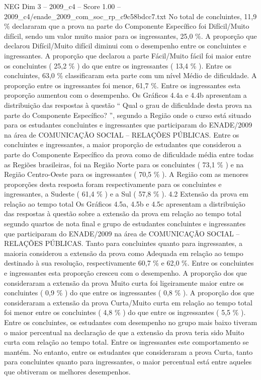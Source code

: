 \begin{textsample}{NEG Dim 3 – 2009\_c4 – Score 1.00 – 2009\_c4/enade\_2009\_com\_soc\_rp\_c9c58bdcc7.txt}
No total de concluintes, 11,9 \% declararam que a prova na parte do Componente Específico foi Difícil/Muito difícil, sendo um valor muito maior para os ingressantes, 25,0 \%.
A proporção que declarou Difícil/Muito difícil diminui com o desempenho entre os concluintes e ingressantes.
A proporção que declarou a parte Fácil/Muito fácil foi maior entre os concluintes ( 25,2 \% ) do que entre os ingressantes ( 13,4 \% ).
Entre os concluintes, 63,0 \% classificaram esta parte com um nível Médio de dificuldade.
A proporção entre os ingressantes foi menor, 61,7 \%.
Entre os ingressantes esta proporção aumentou com o desempenho.
Os Gráficos 4.4a e 4.4b apresentam a distribuição das respostas à questão “ Qual o grau de dificuldade desta prova na parte do Componente Específico? ”, segundo a Região onde o curso está situado para os estudantes concluintes e ingressantes que participaram do ENADE/2009 na área de COMUNICAÇÃO SOCIAL – RELAÇÕES PÚBLICAS.
Entre os concluintes e ingressantes, a maior proporção de estudantes que considerou a parte do Componente Específico da prova como de dificuldade média entre todas as Regiões brasileiras, foi na Região Norte para os concluintes ( 73,1 \% ) e na Região Centro-Oeste para os ingressantes ( 70,5 \% ).
A Região com as menores proporções desta resposta foram respectivamente para os concluintes e ingressantes, a Sudeste ( 61,4 \% ) e a Sul ( 57,8 \% ). 4.2 Extensão da prova em relação ao tempo total Os Gráficos 4.5a, 4.5b e 4.5c apresentam a distribuição das respostas à questão sobre a extensão da prova em relação ao tempo total segundo quartos de nota final e grupo de estudantes concluintes e ingressantes que participaram do ENADE/2009 na área de COMUNICAÇÃO SOCIAL – RELAÇÕES PÚBLICAS.
Tanto para concluintes quanto para ingressantes, a maioria considerou a extensão da prova como Adequada em relação ao tempo destinado à sua resolução, respectivamente 60,7 \% e 62,0 \%.
Entre os concluintes e ingressantes esta proporção cresceu com o desempenho.
A proporção dos que consideraram a extensão da prova Muito curta foi ligeiramente maior entre os concluintes ( 0,9 \% ) do que entre os ingressantes ( 0,8 \% ).
A proporção dos que consideraram a extensão da prova Curta/Muito curta em relação ao tempo total foi menor entre os concluintes ( 4,8 \% ) do que entre os ingressantes ( 5,5 \% ).
Entre os concluintes, os estudantes com desempenho no grupo mais baixo tiveram o maior percentual na declaração de que a extensão da prova teria sido Muito curta com relação ao tempo total.
Entre os ingressantes este comportamento se mantém.
No entanto, entre os estudantes que consideraram a prova Curta, tanto para concluintes quanto para ingressantes, o maior percentual está entre aqueles que obtiveram os melhores desempenhos.

\end{textsample}
